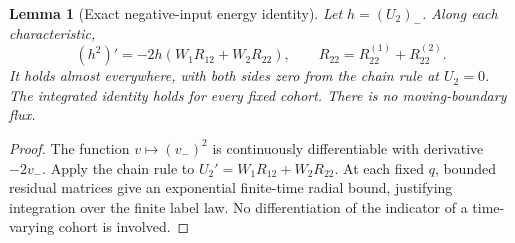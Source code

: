 \documentclass[11pt]{article}
\numberwithin{equation}{section}
\newtheorem{lemma}[theorem]{Lemma}
\theoremstyle{remark}\newtheorem{remark}[theorem]{Remark}
\begin{document}
\begin{lemma}[Exact negative-input energy identity]
\label{an07psev1:identity}
Let \(h=(U_2)_-\). Along each characteristic,
\begin{equation}
 (h^2)'=-2h(W_1R_{12}+W_2R_{22}),\qquad
 R_{22}=R_{22}^{(1)}+R_{22}^{(2)} .
 \label{an07psev1:energyidentity}
\end{equation}
It holds almost everywhere, with both sides zero from the
chain rule at \(U_2=0\). The integrated identity holds for
every fixed cohort. There is no moving-boundary flux.
\end{lemma}
\begin{proof}
The function \(v\mapsto(v_-)^2\) is continuously differentiable
with derivative \(-2v_-\). Apply the chain rule to
\(U_2'=W_1R_{12}+W_2R_{22}\).
At each fixed \(q\), bounded residual matrices give an
exponential finite-time radial bound, justifying
integration over the finite label law. No differentiation
of the indicator of a time-varying cohort is involved.
\end{proof}
\end{document}
